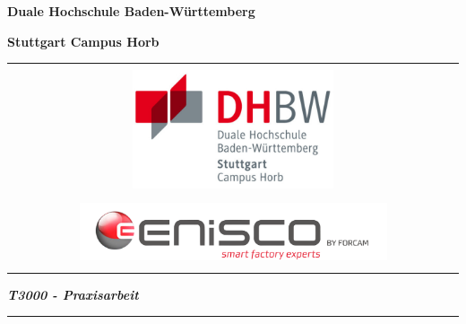 \titlepage
\begin{center}
    \textbf{\large{}Duale Hochschule Baden-Württemberg }{\large\par}
    \par
\end{center}
\begin{center}
    \textbf{\large{}Stuttgart Campus Horb}{\large\par}
    \par
\end{center}
\begin{center}
    \begin{tabular}{l||r}
        \multicolumn{2}{c}{\vspace{1cm}}
        \tabularnewline
        \multicolumn{2}{c}{\includegraphics[height=3.5cm]{images/dhbwlogo}}
        \tabularnewline
        \multicolumn{2}{c}{}
        \tabularnewline
        \multicolumn{2}{c}{\includegraphics[width=0.7\textwidth, scale=1]{images/ENiscobyForcamLogo.png}}
        \tabularnewline
        \multicolumn{2}{c}{\vspace{1cm}}
        \tabularnewline
    \end{tabular}
    \par
\end{center}
\vspace{0.5cm}

\begin{flushleft}
    \textbf{\Large{}\title{}}{\Large\par}
    \par
\end{flushleft}

\begin{flushleft}
    \textbf{\textit{T3000 - Praxisarbeit}}
    \par
\end{flushleft}

\begin{flushleft}
    {\Large{}\rule[0.5ex]{1\columnwidth}{1pt}}{\Large\par}
    \par
\end{flushleft}

